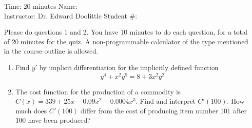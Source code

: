\documentclass[12pt]{article}
\begin{document}
\thispagestyle{plain}

\begin{flushleft}
Time:  20 minutes                \hfill       Name: \underline{\hspace{2in}} \\
Instructor: Dr. Edward Doolittle \hfill Student \#: \underline{\hspace{2in}}
\end{flushleft}

\noindent
Please do questions 1 and 2.  You have 10 minutes
to do each question, for a total of 20
minutes for the quiz.  A non-programmable
calculator of the type mentioned in the course outline is allowed.

\begin{enumerate}
\item Find
  $y'$ by implicit differentiation for the implicitly defined function
  \begin{equation*}
    y^4+x^2y^5=8+3x^2y^2
  \end{equation*}
\newpage
\item The
  cost function for the production of a commodity is
  $C(x)=339+25x-0.09x^2+0.0004x^3$.  Find and interpret $C'(100)$.
  How much does $C'(100)$ differ from the cost of producing item number
  101 after 100 have been produced?
\end{enumerate}
\end{document}
